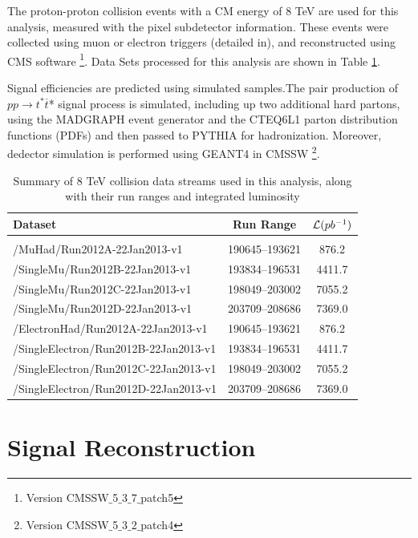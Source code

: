\documentclass[12pt,oneandhalf,chaparabic,phys,ms,eng]{metu}
\begin{document}
The proton-proton collision events with a CM energy of 8 TeV are used for this analysis, measured with the pixel subdetector information. These events were collected using muon or electron triggers (detailed in), and reconstructed using CMS software \footnote{Version CMSSW$\_$5$\_$3$\_$7$\_$patch5}. Data Sets processed for this analysis are shown in Table \ref{DATASets}.

Signal efficiencies are predicted using simulated samples.The pair production of $pp \rightarrow t^* \overline{t}$* signal process is simulated, including up two additional hard partons, using the MADGRAPH \cite{Mad} event generator and the CTEQ6L1 \cite{Cteq} parton distribution functions (PDFs) and then passed to PYTHIA \cite{Pythia} for hadronization. Moreover, dedector simulation is performed using GEANT4 \cite{Geant} in CMSSW \footnote{Version CMSSW$\_$5$\_$3$\_$2$\_$patch4}.

\begin{table}[!hbt]
\caption{Summary of 8 TeV collision data streams used in this analysis, along with their run ranges and integrated luminosity}
\label{DATASets}
\begin{center}
\begin{tabular}{l | c c} %
		 Dataset & Run Range & ${\cal L}(pb^{-1})$ \\ \hline
\\
 /MuHad/Run2012A-22Jan2013-v1  & 190645–193621 & 876.2\\ %
/SingleMu/Run2012B-22Jan2013-v1 & 193834–196531 & 4411.7 \\
/SingleMu/Run2012C-22Jan2013-v1 & 198049–203002 & 7055.2 \\
/SingleMu/Run2012D-22Jan2013-v1 & 203709–208686 &  7369.0 \\
/ElectronHad/Run2012A-22Jan2013-v1  & 190645–193621 & 876.2 \\
/SingleElectron/Run2012B-22Jan2013-v1  & 193834–196531 &  4411.7 \\
/SingleElectron/Run2012C-22Jan2013-v1 & 198049–203002 & 7055.2 \\
/SingleElectron/Run2012D-22Jan2013-v1 & 203709–208686 & 7369.0
\\ %
\end{tabular}
\end{center}
\end{table}


\section{Signal Reconstruction}
\end{document}

